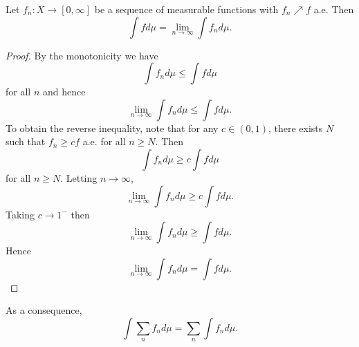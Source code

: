 \begin{theorem}
    Let $f_n:X\to[0,\infty]$ be a sequence of measurable functions with 
    $f_n\nearrow f$ a.e. Then
    \begin{equation*}
        \int fd\mu = \lim_{n\to\infty}\int f_nd\mu.
    \end{equation*}
\end{theorem}
\begin{proof}
    By the monotonicity we have 
    \begin{equation*}
        \int f_nd\mu \leq \int fd\mu
    \end{equation*}
    for all $n$ and hence 
    \begin{equation*}
        \lim_{n\to\infty}\int f_nd\mu \leq \int fd\mu.
    \end{equation*}
    To obtain the reverse inequality, note that for any $c\in(0,1)$, 
    there exists $N$ such that $f_n\geq cf$ a.e. for all $n\geq N$. 
    Then 
    \begin{equation*}
        \int f_nd\mu \geq c\int fd\mu
    \end{equation*}
    for all $n\geq N$. Letting $n\to\infty$, 
    \begin{equation*}
        \lim_{n\to\infty}\int f_nd\mu \geq c\int fd\mu.
    \end{equation*}
    Taking $c\to 1^-$ then 
    \begin{equation*}
        \lim_{n\to\infty}\int f_nd\mu \geq \int fd\mu.
    \end{equation*}
    Hence 
    \begin{equation*}
        \lim_{n\to\infty}\int f_nd\mu = \int fd\mu.
    \end{equation*}
\end{proof}
\begin{remark}
    As a consequence,
    \begin{equation*}
        \int \sum_n f_nd\mu = \sum_n \int f_nd\mu.
    \end{equation*}
\end{remark}

